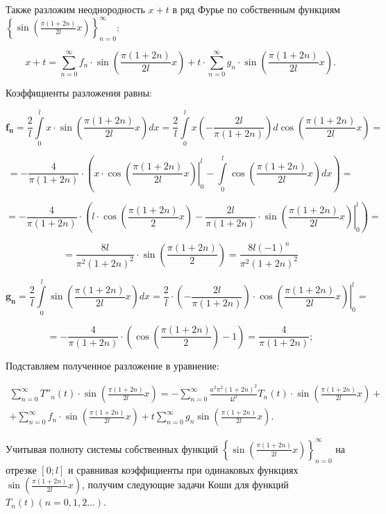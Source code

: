 Также разложим неоднородность $x + t$ в ряд Фурье по собственным функциям $\left\{ \sin \left( \frac{\pi (1 + 2n)}{2l}x \right)  \right\}_{n=0}^{\infty}$:

$$ x + t = \sum_{n=0}^{\infty} f_{n} \cdot \sin \left( \frac{\pi(1 + 2n)}{2l}x \right) + t \cdot \sum_{n=0}^{\infty} g_{n} \cdot \sin \left( \frac{\pi(1 + 2n)}{2l}x \right).$$

Коэффициенты разложения равны:

$$\boldsymbol{f_{n}} = \frac{2}{l} \int\limits_0^l x \cdot \sin \left( \frac{\pi(1 + 2n)}{2l}x \right) dx = \frac{2}{l} \int\limits_0^l x \left( -\frac{2l}{\pi(1 + 2n)} \right)d \cos\left( \frac{\pi(1 + 2n)}{2l}x \right) = $$

$$= -\frac{4}{\pi(1 + 2n)} \cdot \left( \left. x \cdot \cos\left( \frac{\pi(1 + 2n)}{2l}x \right) \right|_{0}^{l} - \int\limits_0^l \cos \left( \frac{\pi(1 + 2n)}{2l}x \right) dx \right) = $$

$$ = -\frac{4}{\pi(1 + 2n)} \cdot \left( l\cdot \cos \left( \frac{\pi(1 + 2n)}{2}x \right) - \left. \frac{2l}{\pi(1 + 2n)} \cdot \sin \left( \frac{\pi(1 + 2n)}{2l}x \right) \right|_{0}^{l} \right) = $$

$$ = \frac{8l}{\pi^{2}(1 + 2n)^{2}} \cdot \sin \left( \frac{\pi(1 + 2n)}{2} \right) = \frac{8l(-1)^{n}}{\pi^{2}(1 + 2n)^{2}} $$

$$\boldsymbol{g_{n}} = \frac{2}{l} \int\limits_0^l \sin\left( \frac{\pi(1 + 2n)}{2l}x \right) dx = \frac{2}{l} \cdot \left. \left( -\frac{2l}{\pi(1 + 2n)} \right) \cdot \cos \left( \frac{\pi(1 + 2n)}{2l}x \right) \right|_{0}^{l} = $$

$$= - \frac{4}{\pi(1 + 2n)} \cdot \left( \cos \left( \frac{\pi(1 + 2n)}{2} \right) - 1 \right) = \frac{4}{\pi(1 + 2n)};$$

Подставляем полученное разложение в уравнение:

\begin{multline*}
\sum_{n=0}^{\infty} T''_{n}(t) \cdot \sin \left( \frac{\pi(1 + 2n)}{2l}x \right) = -\sum_{n=0}^{\infty} \frac{a^{2}\pi^{2}(1 + 2n)^{2}}{4l^{2}}T_{n}(t) \cdot \sin \left( \frac{\pi(1 + 2n)}{2l}x \right) +\\
+ \sum_{n=0}^{\infty} f_{n} \cdot \sin \left( \frac{\pi(1 + 2n)}{2l}x \right) + t \sum_{n=0}^{\infty} g_{n} \sin \left( \frac{\pi(1 + 2n)}{2l}x \right).
\end{multline*}

Учитывая полноту системы собственных функций $\left\{ \sin \left( \frac{\pi (1 + 2n)}{2l}x \right)  \right\}_{n=0}^{\infty}$ на отрезке $[0; l]$ и сравнивая коэффициенты при одинаковых функциях $\sin \left( \frac{\pi (1 + 2n)}{2l}x \right)$, получим следующие задачи Коши для функций $T_{n}(t)(n=0,1,2\ldots)$.

